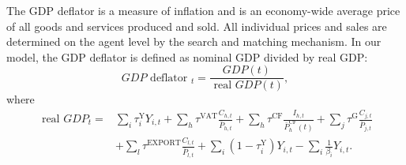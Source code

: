 The GDP deflator is a measure of inflation and is an economy-wide average price of all goods and services produced and sold. All individual prices and sales are determined on the agent level by the search and matching mechanism. In our model, the GDP deflator is defined as nominal GDP divided by real GDP:
\begin{equation}
    G D P \text { deflator }_t=\frac{G D P(t)}{\text { real } G D P(t)},
\end{equation}
where
\begin{equation}
    \begin{aligned}
\text { real } G D P_t= & \sum_i \tau_i^{\mathrm{Y}} Y_{i,t}+\sum_h \tau^{\mathrm{VAT}} \frac{C_{h,t}}{\bar{P}_{h,t}}+\sum_h \tau^{\mathrm{CF}} \frac{I_{h,t}}{\bar{P}_h^{\mathrm{CF}}(t)}+\sum_j \tau^{\mathrm{G}} \frac{C_{j,t}}{\bar{P}_{j,t}} \\
& +\sum_l \tau^{\mathrm{EXPORT}} \frac{C_{l,t}}{\bar{P}_{l,t}}+\sum_i\left(1-\tau_i^{\mathrm{Y}}\right) Y_{i,t}-\sum_i \frac{1}{\beta_i} Y_{i,t} .
\end{aligned}
\end{equation}